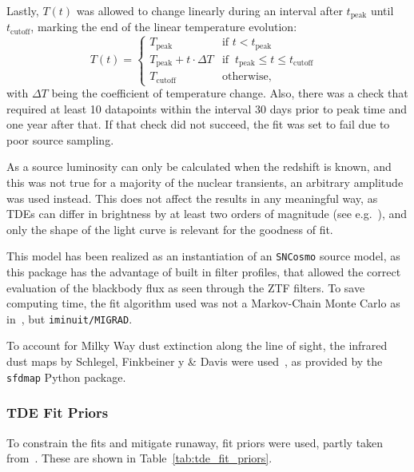 Lastly, $T(t)$ was allowed to change linearly during an interval after $t_\text{peak}$ until $t_\text{cutoff}$, marking the end of the linear temperature evolution:
\begin{equation}
  T(t) = \begin{cases}
    T_\text{peak}                    & \text{if $t<t_\text{peak}$}                              \\
    T_\text{peak} + t \cdot \Delta T & \text{if $~t_\text{peak} \leq t \leq t_\text{cutoff} $ } \\
    T_\text{cutoff}                  & \text{otherwise},
  \end{cases}
\end{equation}
with $\Delta T$ being the coefficient of temperature change. Also, there was a check that required at least 10 datapoints within the interval 30 days prior to peak time and one year after that. If that check did not succeed, the fit was set to fail due to poor source sampling.

As a source luminosity can only be calculated when the redshift is known, and this was not true for a majority of the nuclear transients, an arbitrary amplitude was used instead. This does not affect the results in any meaningful way, as TDEs can differ in brightness by at least two orders of magnitude (see e.g.~\cite{Hammerstein2022}), and only the shape of the light curve is relevant for the goodness of fit.\cite{Hammerstein2022}

This model has been realized as an instantiation of an \texttt{SNCosmo} source model, as this package has the advantage of built in filter profiles, that allowed the correct evaluation of the blackbody flux as seen through the ZTF filters. To save computing time, the fit algorithm used was not a Markov-Chain Monte Carlo as in~\cite{Velzen2021a}, but \texttt{iminuit/MIGRAD}.

To account for Milky Way dust extinction along the line of sight, the infrared dust maps by Schlegel, Finkbeiner y \& Davis were used~, as provided by the \texttt{sfdmap} Python package.

\subsubsection{TDE Fit Priors}
To constrain the fits and mitigate runaway, fit priors were used, partly taken from~\cite{Velzen2021a}. These are shown in Table~\ref{tab:tde_fit_priors}.

